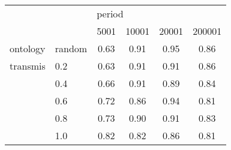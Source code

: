 \begin{tabular}{|ll|cccc|}
\toprule
         &     & \multicolumn{4}{l}{period} \\
         &     &   5001 & 10001 & 20001 & 200001 \\
\midrule
ontology & random &   0.63 &  0.91 &  0.95 &   0.86 \\
transmis & 0.2 &   0.63 &  0.91 &  0.91 &   0.86 \\
         & 0.4 &   0.66 &  0.91 &  0.89 &   0.84 \\
         & 0.6 &   0.72 &  0.86 &  0.94 &   0.81 \\
         & 0.8 &   0.73 &  0.90 &  0.91 &   0.83 \\
         & 1.0 &   0.82 &  0.82 &  0.86 &   0.81 \\
\bottomrule
\end{tabular}
